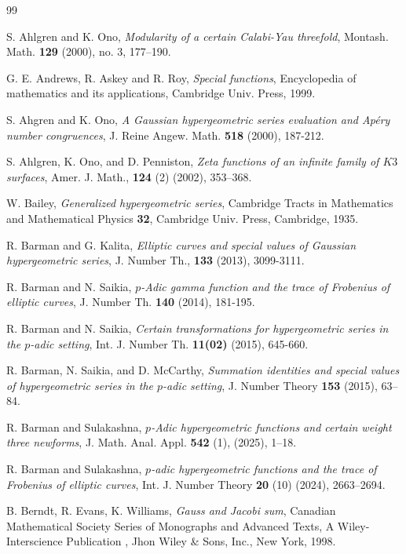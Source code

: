 \documentclass[12pt]{amsart}
\theoremstyle{plain}
\theoremstyle{definition}
\theoremstyle{remark}
\numberwithin{equation}{section}
\begin{document}
	\begin{thebibliography}{99}		
		
				
		
		S. Ahlgren and K. Ono, {\it Modularity of a certain Calabi-Yau threefold}, Montash. Math. {\bf 129} (2000), no. 3,  177--190.
		
		G. E. Andrews, R. Askey and R. Roy, \emph{Special functions}, Encyclopedia of mathematics and its applications, Cambridge Univ. Press, 1999.
		
		 S. Ahgren and K. Ono, \emph{A Gaussian hypergeometric series evaluation and Ap\'ery number congruences},
		J. Reine Angew. Math. \textbf{518} (2000), 187-212.
		
		S. Ahlgren, K. Ono, and D. Penniston, {\it Zeta functions of an infinite family of $K3$ surfaces}, Amer. J. Math.,
		{\bf  124} (2) (2002), 353--368.
		
		W. Bailey, {\it Generalized hypergeometric series}, Cambridge Tracts in Mathematics and Mathematical Physics \textbf{32}, Cambridge Univ. Press, Cambridge, 1935.
		
		 R. Barman and G. Kalita, \emph{Elliptic curves and special values of Gaussian hypergeometric series}, J. Number Th., \textbf{133} (2013), 3099-3111.
		
		 R. Barman and N. Saikia, \emph{$p$-Adic gamma function and the trace of Frobenius of elliptic curves}, J. Number Th.  \textbf{140} (2014), 181-195.
		
		 R. Barman and N. Saikia, \emph{Certain transformations for hypergeometric series in the $p$-adic setting}, Int. J. Number Th. \textbf{11(02)} (2015), 645-660.
		
		 R. Barman, N. Saikia, and D. McCarthy, \emph{Summation identities and special values of hypergeometric series in the $p$-adic setting}, J. Number Theory \textbf{153} (2015), 63--84.
		
		 R. Barman and Sulakashna, \emph{$p$-Adic hypergeometric functions and certain weight three newforms}, J. Math. Anal. Appl. \textbf{542} (1), (2025), 1--18.
		
		 R. Barman and Sulakashna, \emph{$p$-adic hypergeometric functions and the trace of Frobenius of elliptic curves}, Int. J. Number Theory \textbf{20} (10) (2024), 2663--2694.
		
		
    B. Berndt, R. Evans, K. Williams,  \emph{Gauss and Jacobi sum}, Canadian Mathematical Society Series of Monographs and Advanced Texts, A Wiley-Interscience Publication , Jhon Wiley \& Sons, Inc., New York, 1998.


\end{thebibliography}
\end{document}
